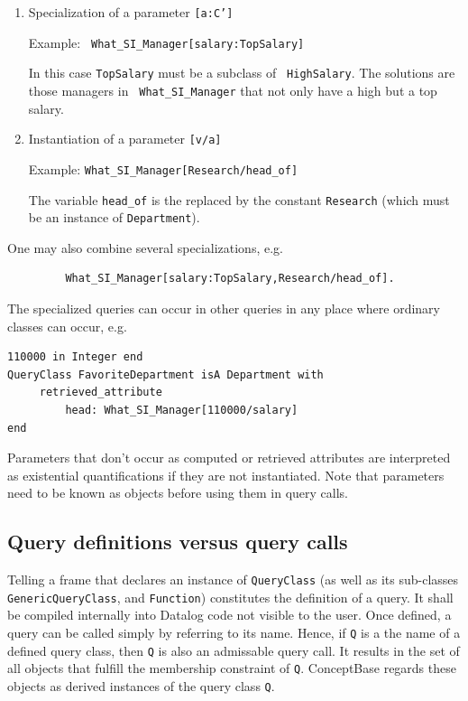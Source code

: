 \begin{enumerate}
\item Specialization of  a parameter {\tt [a:C']}

Example: \verb+ What_SI_Manager[salary:TopSalary]+

In this case {\tt TopSalary} must be a subclass of {\tt
  HighSalary}. The solutions are those managers in \verb+ What_SI_Manager+
that not only have a high but a top salary.
\item Instantiation of a parameter {\tt [v/a]}

Example: \verb+What_SI_Manager[Research/head_of]+

The variable \verb+head_of+ is the replaced by the constant {\tt Research} (which must
be an instance of {\tt Department}).
\end{enumerate}

One may also combine several specializations, e.g.
\begin{verbatim}
         What_SI_Manager[salary:TopSalary,Research/head_of].
\end{verbatim}

The specialized queries can occur in other queries in any place where
ordinary classes can occur, e.g.

{\small
\begin{verbatim}
110000 in Integer end
QueryClass FavoriteDepartment isA Department with
     retrieved_attribute
         head: What_SI_Manager[110000/salary]
end
\end{verbatim}
}

Parameters that don't occur as computed or retrieved attributes are
interpreted as existential quantifications if they are not instantiated.
Note that parameters need to be known as objects before using them in
query calls.

\subsection{Query definitions versus query calls}
 \label{sec:qdefvscalls}

Telling a frame that declares an instance of {\tt QueryClass} (as well as its
sub-classes {\tt Generic\-Query\-Class}, and {\tt Function}) constitutes the
definition of a query. It shall be compiled internally into Datalog code not
visible to the user. Once defined, a query can be called simply by referring to
its name. Hence, if {\tt Q} is a the name of a defined query class, then {\tt Q}
is also an admissable query call. It results in the set of all objects that fulfill the
membership constraint of {\tt Q}. ConceptBase regards these objects as derived instances of
the query class {\tt Q}.

